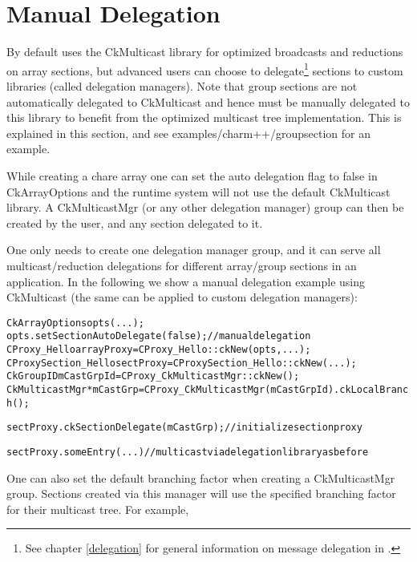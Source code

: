 \section{Manual Delegation}
\label{Manual Delegation}

By default \charmpp{} uses the CkMulticast library for optimized broadcasts and
reductions on array sections, but advanced \charmpp{} users can choose to
delegate\footnote{See chapter \ref{delegation} for general information on message delegation in \charmpp{}.}
sections to custom libraries (called delegation managers).
Note that group sections are not automatically
delegated to CkMulticast and hence must be manually delegated to this library
to benefit from the optimized multicast tree implementation.
This is explained in this section, and see examples/charm++/groupsection for an example.

While creating a chare array one can set the auto delegation flag to
false in CkArrayOptions and the runtime system will not use the default CkMulticast library.
A CkMulticastMgr (or any other delegation manager) group can then be created by the user, and any
section delegated to it.

One only needs to create one delegation manager group, and it
can serve all multicast/reduction delegations for different array/group sections in an application.
In the following we show a manual delegation example using CkMulticast (the same can be applied
to custom delegation managers):

\begin{alltt}
  CkArrayOptions opts(...);
  opts.setSectionAutoDelegate(false); // manual delegation
  CProxy_Hello arrayProxy = CProxy_Hello::ckNew(opts,...);
  CProxySection_Hello sectProxy = CProxySection_Hello::ckNew(...);
  CkGroupID mCastGrpId = CProxy_CkMulticastMgr::ckNew();
  CkMulticastMgr *mCastGrp = CProxy_CkMulticastMgr(mCastGrpId).ckLocalBranch();

  sectProxy.ckSectionDelegate(mCastGrp);  // initialize section proxy

  sectProxy.someEntry(...)           // multicast via delegation library as before

\end{alltt}

One can also set the default branching factor when creating a CkMulticastMgr group.
Sections created via this manager will use the specified branching factor for their multicast tree.
For example,

